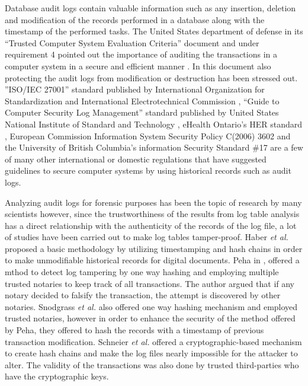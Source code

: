 Database audit logs contain valuable information such as any insertion, deletion and modification of the records performed in a database along with the timestamp of the performed tasks. The United States department of defense in its “Trusted Computer System Evaluation Criteria” document and under requirement 4 pointed out the importance of auditing the transactions in a computer system in a secure and efficient manner \cite{USDoD1985}. In this document also protecting the audit logs from modification or destruction has been stressed out. ”ISO/IEC 27001” standard published by International Organization for Standardization and International Electrotechnical Commission \cite{ISOIEC27001}, “Guide to Computer Security Log Management” standard published by United States National Institute of Standard and Technology \cite{NIST2006}, eHealth Ontario's HER standard \cite{ehealth3542}, European Commission Information System Security Policy C(2006) 3602 \cite{EC2006} and the University of British Columbia's information Security Standard {\#}17 \cite{UBC2014} are a few of many other international or domestic regulations that have suggested guidelines to secure computer systems by using historical records such as audit logs.

Analyzing audit logs for forensic purposes has been the topic of research by many scientists however, since the trustworthiness of the results from log table analysis has a direct relationship with the authenticity of the records of the log file, a lot of studies have been carried out to make log tables tamper-proof. Haber {\it et al.}\cite{haber1991how} proposed a basic methodology by utilizing timestamping and hash chains in order to make unmodifiable historical records for digital documents. Peha in \cite{peha1999electronic}, offered a mthod to detect log tampering by one way hashing and employing multiple trusted notaries to keep track of all transactions. The author argued that if any notary decided to falsify the transaction, the attempt is discovered by other notaries. Snodgrass {\it et al.} \cite{snodgrass2004Tamper} also offered one way hashing mechanism and employed trusted notaries, however in order to enhance the security of the method offered by Peha, they offered to hash the records with a timestamp of previous transaction modification. Schneier {\it et al.}\cite{schneier1998cryptoraphic} offered a cryptographic-based mechanism to create hash chains and make the log files nearly impossible for the attacker to alter. The validity of the transactions was also done by trusted third-parties who have the cryptographic keys.

